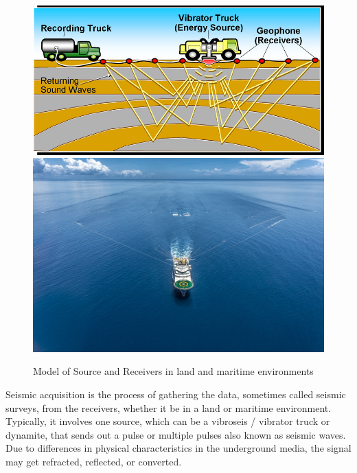 \begin{figure}[ht]
	\centering
	\includegraphics[width=0.39\textheight]{Images/SeismicChes5.jpg}
	\includegraphics[width=0.3\textheight]{Images/2562_geo_coral_large.jpg}
	\caption{Model of Source and Receivers in land and maritime environments}
	\label{fig:Seismic-Acquisition}
\end{figure}

Seismic acquisition is the process of gathering the data, sometimes called seismic surveys, from the receivers, whether it be in a land or maritime environment. Typically, it involves one source, which can be a vibroseis / vibrator truck or dynamite, that sends out a pulse or multiple pulses also known as seismic waves. Due to differences in physical characteristics in the underground media, the signal may get refracted, reflected, or converted. 

